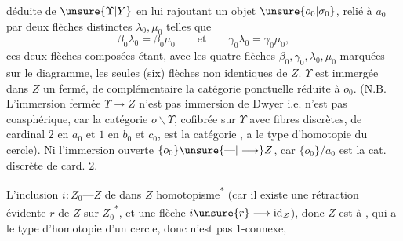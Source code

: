 déduite de $\unsure{\Upsilon|Y}$ en lui rajoutant un objet $\unsure{o_0|\sigma_0}$, relié à $a_0$ par deux flèches distinctes $\lambda_0,\mu_0$ telles que
\[
\beta_0\lambda_0=\beta_0\mu_0\qquad\text{et}\qquad\gamma_0\lambda_0=\gamma_0\mu_0,
\]
ces deux flèches composées étant, avec les quatre flèches $\beta_0,\gamma_0,\lambda_0,\mu_0$ marquées sur le diagramme, les seules (six) flèches non identiques de $Z$. $\Upsilon$  est immergée dans $Z$  un fermé, de complémentaire la catégorie ponctuelle réduite à $o_0$. (N.B. L’immersion fermée $\Upsilon\longrightarrow Z$ n’est pas immersion de Dwyer  i.e. n’est pas coasphérique, car la catégorie $o\backslash\Upsilon$, cofibrée sur $\Upsilon$ avec fibres discrètes, de cardinal $2$ en $a_0$ et $1$ en $b_0$ et $c_0$, est la catégorie
,  
\diagram{\begin{tikzcd}[ampersand replacement=\&,row sep=tiny,column sep=tiny]
{} \& \bullet\\
\bullet\arrow[ur]\arrow[dr] \& {} \& \bullet\arrow[ul]\arrow[dl]\\
{} \& \bullet
\end{tikzcd}}
 a le type d’homotopie du cercle). Ni l’immersion ouverte $\{o_0\}\unsure{\text{---}|\longrightarrow}Z$, car $\{o_0\}/a_0$ est la cat. discrète de card. $2$.

L’inclusion  $i:Z_0\text{---}Z$ de
dans $Z$   homotopisme\textsuperscript{*} (car il existe une rétraction évidente $r$ de $Z$ sur $Z_0$\textsuperscript{*}, et une flèche $i\unsure{r}\longrightarrow\mathrm{id}_Z$), donc $Z$ est  à , qui a le type d’homotopie d’un cercle, donc n’est pas $1$-connexe,

